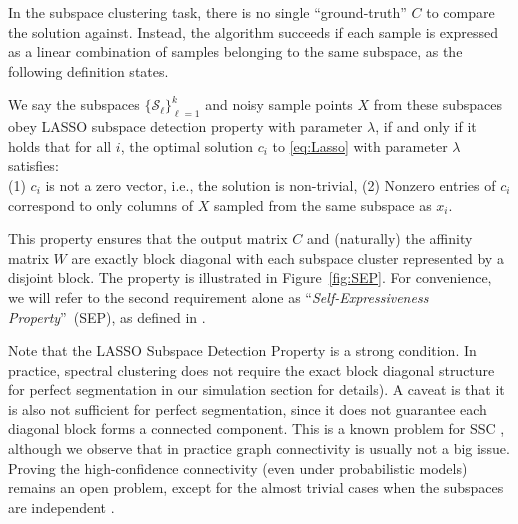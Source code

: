 \documentclass[main]{subfiles}
\begin{document}
In the subspace clustering task, there is no single ``ground-truth'' $C$ to compare the solution against. Instead, the algorithm succeeds if each sample is expressed as a linear combination of samples belonging to the same subspace, as the following definition states.
\begin{definition}\label{def:lasso_detection}
We say the subspaces $\{\mathcal{S}_{\ell}\}_{\ell=1}^{k}$ and noisy sample points $X$ from these subspaces obey LASSO subspace detection property with parameter $\lambda$, if and only if it holds that for all $i$, the optimal solution $c_i$ to \eqref{eq:Lasso} with parameter $\lambda$ satisfies:\\
\indent (1) $c_i$ is not a zero vector, i.e., the solution is non-trivial,
\indent (2) Nonzero entries of $c_i$ correspond to only columns of $X$ sampled from the same subspace as $x_i$.
\end{definition}
This property ensures that the output matrix $C$ and (naturally) the affinity matrix $W$ are exactly block diagonal with each subspace cluster represented by a disjoint block.  The property is illustrated in Figure~\ref{fig:SEP}. For convenience, we will refer to the second requirement alone as ``\emph{Self-Expressiveness Property}''~(SEP), as defined in \cite{elhamifar2012ssc_journal}.

Note that the LASSO Subspace Detection Property is a strong condition. In practice, spectral clustering does not require the exact block diagonal structure for perfect segmentation in our simulation section for details). A caveat is that it is also not sufficient for perfect segmentation, since it does not guarantee each diagonal block forms a connected component. This is a known problem for SSC \cite{nasihatkon2011graph}, although we observe that in practice graph connectivity is usually not a big issue. Proving the high-confidence connectivity (even under probabilistic models) remains an open problem, except for the almost trivial cases when the subspaces are independent \cite{liu2013LRR, wang2013provable}.
\end{document}
